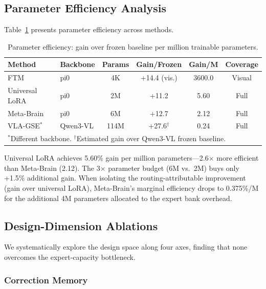 \documentclass[letterpaper]{article}
\newcommand{\ours}{Meta-Brain}
\begin{document}
\subsection{Parameter Efficiency Analysis}
\label{sec:exp_efficiency}

Table~\ref{tab:efficiency} presents parameter efficiency across methods.

\begin{table}[h]
\centering
\caption{Parameter efficiency: gain over frozen baseline per million trainable parameters.}
\label{tab:efficiency}
\begin{tabular}{llcccc}
\toprule
Method & Backbone & Params & Gain/Frozen & Gain/M & Coverage \\
\midrule
FTM & pi0 & 4K & +14.4 (vis.) & 3600.0 & Visual \\
Universal LoRA & pi0 & 2M & +11.2 & 5.60 & Full \\
\ours{} & pi0 & 6M & +12.7 & 2.12 & Full \\
VLA-GSE$^*$ & Qwen3-VL & 114M & +27.6$^\dagger$ & 0.24 & Full \\
\bottomrule
\multicolumn{6}{l}{\footnotesize $^*$Different backbone. $^\dagger$Estimated gain over Qwen3-VL frozen baseline.}
\end{tabular}
\end{table}

Universal LoRA achieves 5.60\% gain per million parameters---2.6$\times$ more efficient than \ours{} (2.12).
The 3$\times$ parameter budget (6M vs.\ 2M) buys only +1.5\% additional gain.
When isolating the routing-attributable improvement (gain over universal LoRA), \ours{}'s marginal efficiency drops to 0.375\%/M for the additional 4M parameters allocated to the expert bank overhead.

\subsection{Design-Dimension Ablations}
\label{sec:exp_ablations}

We systematically explore the design space along four axes, finding that none overcomes the expert-capacity bottleneck.

\subsubsection{Correction Memory}
\end{document}
